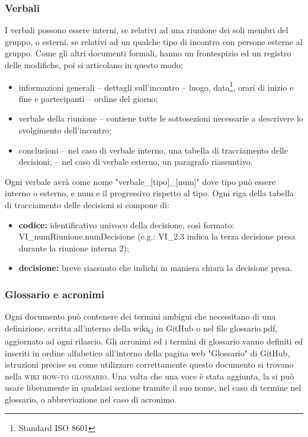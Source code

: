     \subsubsection{Verbali}
    \label{verbali}
    I verbali possono essere interni, se relativi ad una riunione dei soli membri del gruppo, o esterni, se relativi ad un qualche tipo di incontro con persone esterne al gruppo. Come gli altri documenti formali, hanno un frontespizio ed un registro delle modifiche, poi si articolano in questo modo:
    \begin{itemize}
        \item informazioni generali
        \subitem -- dettagli sull'incontro
        \subsubitem -- luogo, data\footnote{Standard ISO 8601}, orari di inizio e fine e partecipanti
        \subitem -- ordine del giorno;
        \item verbale della riunione
        \subitem -- contiene tutte le sottosezioni necessarie a descrivere lo svolgimento dell'incontro;
        \item conclusioni
        \subitem -- nel caso di verbale interno, una tabella di tracciamento delle decisioni;
        \subitem -- nel caso di verbale esterno, un paragrafo riassuntivo.
    \end{itemize}
    Ogni verbale avrà come nome "verbale\_[tipo]\_[num]" dove tipo può essere interno o esterno, e num e il progressivo rispetto al tipo.
    Ogni riga della tabella di tracciamento delle decisioni si compone di:
    \begin{itemize}
        \item \textbf{codice: }identificativo univoco della decisione, così formato: VI\_numRiunione.numDecisione (e.g.: VI\_2.3 indica la terza decisione presa durante la riunione interna 2);
        \item \textbf{decisione: }breve riassunto che indichi in maniera chiara la decisione presa.
    \end{itemize}
    \subsubsection{Glossario e acronimi}
    Ogni documento può contenere dei termini ambigui che necessitano di una definizione, scritta all'interno della wiki\textsubscript{G} in GitHub o nel file glossario.pdf, aggiornato ad ogni rilascio.
    Gli acronimi ed i termini di glossario vanno definiti ed inseriti in ordine alfabetico all'interno della pagina web "Glossario" di GitHub, istruzioni precise su come utilizzare correttamente questo documento si trovano nella \textsc{wiki how-to glossario}. Una volta che una voce è stata aggiunta, la si può usare liberamente in qualsiasi sezione tramite il suo nome, nel caso di termine nel glossario, o abbreviazione nel caso di acronimo.


